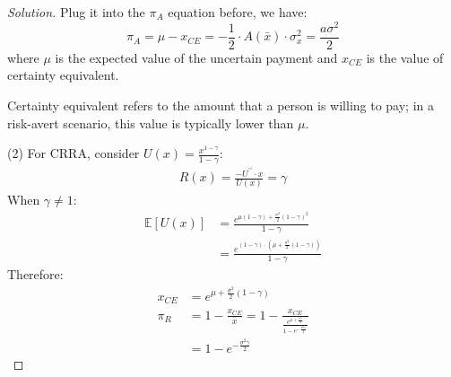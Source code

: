 \documentclass[12pt]{article}
\newenvironment{problem}[2][Problem]{\begin{trivlist}
\item[\hskip \labelsep {\bfseries #1}\hskip \labelsep {\bfseries #2.}]}{\end{trivlist}}
\newenvironment{solution}
  {\renewcommand\qedsymbol{$\blacksquare$}\begin{proof}[Solution]}
  {\end{proof}}
\begin{document}
\begin{solution}
Plug it into the $\pi_A$ equation before, we have: 
\begin{equation}
\pi_A = \mu - x_{CE} = -\frac{1}{2} \cdot A(\bar{x}) \cdot \sigma_x^2 = \frac{a\sigma^2}{2}
\end{equation}
where $\mu$ is the expected value of the uncertain payment and $x_{CE}$ is the value of certainty equivalent.

Certainty equivalent refers to the amount that a person is willing to pay; in a risk-avert scenario, this value is typically lower than $\mu$. 

(2) For \gls{CRRA}, consider $U(x) = \frac{x^{1-\gamma}}{1-\gamma}$:
\begin{gather}
R(x) = \frac{-U^{\prime\prime} \cdot x}{U(x)} = \gamma
\end{gather}
When $\gamma \neq 1$:
\begin{align}
\mathbb{E}[U(x)] &= \frac{e^{\mu(1-\gamma) + \frac{\sigma^2}{2}(1-\gamma)^2}}{1-\gamma} \\
&= \frac{e^{(1-\gamma)\cdot (\mu + \frac{\sigma^2}{2}(1-\gamma))}}{1-\gamma}
\end{align}
Therefore:
\begin{align}
x_{CE} &=e^{\mu + \frac{\sigma^2}{2}(1-\gamma)} \\
\pi_R &= 1 - \frac{x_{CE}}{\bar{x}} = 1  - \frac{x_{CE}}{\frac{e^{\mu+
	\frac{\sigma^2}{2}}}{1-e^{-\frac{\sigma^2\gamma}{2}}}} \\
&= 1 - e^{-\frac{\sigma^2\gamma}{2}}
\end{align}
\end{solution}

%
\end{document}
